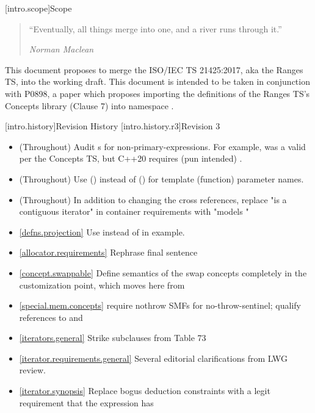 [intro.scope]{Scope}

\begin{quote}
``Eventually, all things merge into one, and a river runs through it.''
\begin{flushright}
\textemdash \textit{Norman Maclean}
\end{flushright}
\end{quote}

\pnum
This document proposes to merge the ISO/IEC TS 21425:2017, aka the Ranges TS,
into the working draft. This document is intended to be taken in conjunction with
P0898, a paper which proposes importing the definitions of the Ranges TS's Concepts
library (Clause 7) into namespace .

[intro.history]{Revision History}
[intro.history.r3]{Revision 3}
\begin{itemize}
\item (Throughout) Audit s for
  non-primary-expressions. For example,  was a valid
   per the Concepts TS, but C++20 requires
  (pun intended) .
\item (Throughout) Use  () instead of  () for
   template (function) parameter names.
\item (Throughout) In addition to changing the cross references, replace
  "is a contiguous iterator" in container requirements with "models
  "
\item \ref{defns.projection} Use  instead of 
  in example.
\item \ref{allocator.requirements} Rephrase final sentence
\item \ref{concept.swappable} Define semantics of the swap concepts completely in
  the  customization point, which moves here from 
\item \ref{special.mem.concepts} require nothrow SMFs for no-throw-sentinel;
  qualify references to  and 
\item \ref{iterators.general} Strike subclauses from Table 73
\item \ref{iterator.requirements.general} Several editorial clarifications from
  LWG review.
\item \ref{iterator.synopsis} Replace bogus 
  deduction constraints with a legit requirement that the expression has

\end{itemize}
